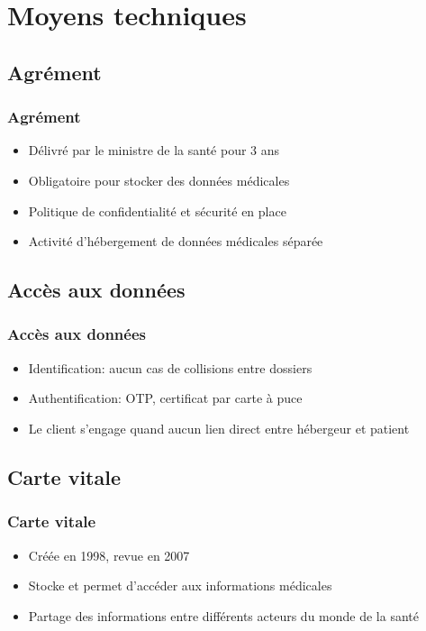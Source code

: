     \section{Moyens techniques}

\subsection{Agrément}
\begin{frame}
\frametitle{Agrément}
\begin{itemize}
    \itemsep2em
    \item Délivré par le ministre de la santé pour 3 ans
    \item Obligatoire pour stocker des données médicales
    \item Politique de confidentialité et sécurité en place
    \item Activité d'hébergement de données médicales séparée
\end{itemize}
\end{frame}

\subsection{Accès aux données}
\begin{frame}
\frametitle{Accès aux données}
\begin{itemize}
    \itemsep2em
    \item Identification: aucun cas de collisions entre dossiers
    \item Authentification: OTP, certificat par carte à puce
    \item Le client s'engage quand aucun lien direct entre hébergeur et patient
\end{itemize}
\end{frame}

\subsection{Carte vitale}
\begin{frame}
\frametitle{Carte vitale}
\begin{itemize}
    \itemsep2em
    \item Créée en 1998, revue en 2007
    \item Stocke et permet d'accéder aux informations médicales
    \item Partage des informations entre différents acteurs du monde de la
        santé
\end{itemize}
\end{frame}

